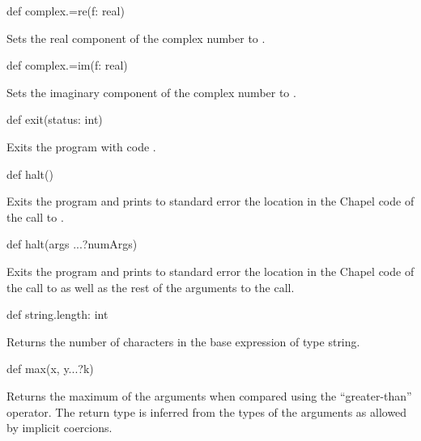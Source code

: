 \begin{protohead}
def complex.=re(f: real)
\end{protohead}
\begin{protobody}
Sets the real component of the complex number to .
\end{protobody}

\begin{protohead}
def complex.=im(f: real)
\end{protohead}
\begin{protobody}
Sets the imaginary component of the complex number to .
\end{protobody}

\begin{protohead}
def exit(status: int)
\end{protohead}
\begin{protobody}
Exits the program with code .
\end{protobody}

\begin{protohead}
def halt()
\end{protohead}
\begin{protobody}
Exits the program and prints to standard error the location in the
Chapel code of the call to .
\end{protobody}

\begin{protohead}
def halt(args ...?numArgs)
\end{protohead}
\begin{protobody}
Exits the program and prints to standard error the location in the
Chapel code of the call to  as well as the rest of the
arguments to the call.
\end{protobody}

\begin{protohead}
def string.length: int
\end{protohead}
\begin{protobody}
Returns the number of characters in the base expression of type string.
\end{protobody}

\begin{protohead}
def max(x, y...?k)
\end{protohead}
\begin{protobody}
Returns the maximum of the arguments when compared using the
``greater-than'' operator.  The return type is inferred from the types
of the arguments as allowed by implicit coercions.
\end{protobody}


